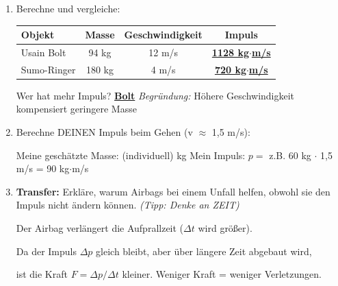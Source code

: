 \documentclass[11pt,a4paper]{article}
\newcommand{\lsg}[1]{\textcolor{loesung}{\underline{\textbf{#1}}}}
\newcommand{\lsgtext}[1]{\textcolor{loesung}{#1}}
\begin{document}
\begin{enumerate}[label=\alph*), leftmargin=*, itemsep=10pt]

\item Berechne und vergleiche:

\vspace{5pt}
\begin{tabular}{|l|c|c|c|}
\hline
\textbf{Objekt} & \textbf{Masse} & \textbf{Geschwindigkeit} & \textbf{Impuls} \\
\hline
Usain Bolt & 94 kg & 12 m/s & \lsg{1128 kg$\cdot$m/s} \\
\hline
Sumo-Ringer & 180 kg & 4 m/s & \lsg{720 kg$\cdot$m/s} \\
\hline
\end{tabular}

\vspace{5pt}
Wer hat mehr Impuls? \lsg{Bolt} \hfill \textit{Begründung:} \lsgtext{Höhere Geschwindigkeit kompensiert geringere Masse}

\vspace{8pt}

\item Berechne DEINEN Impuls beim Gehen (v $\approx$ 1,5 m/s):

\vspace{3pt}
Meine geschätzte Masse: \lsgtext{(individuell)} kg \hfill Mein Impuls: $p = $ \lsgtext{z.B. 60 kg $\cdot$ 1,5 m/s = 90 kg$\cdot$m/s}

\vspace{8pt}

\item \textbf{Transfer:} Erkläre, warum Airbags bei einem Unfall helfen, obwohl sie den Impuls nicht ändern können. \textit{(Tipp: Denke an ZEIT)}

\vspace{3pt}
\lsgtext{Der Airbag verlängert die Aufprallzeit ($\Delta t$ wird größer).}

\lsgtext{Da der Impuls $\Delta p$ gleich bleibt, aber über längere Zeit abgebaut wird,}

\lsgtext{ist die Kraft $F = \Delta p / \Delta t$ kleiner. Weniger Kraft = weniger Verletzungen.}

\end{enumerate}

\vspace{5mm}

\end{document}
